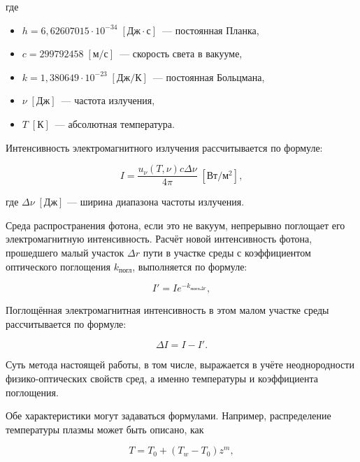 \noindent где
\begin{itemize}
	\item $h = 6,62607015 \cdot 10^{-34} \; \left[\text{Дж}\cdot\text{с}\right]$~— постоянная Планка,
	\item $c = 299792458 \; \left[\text{м}/\text{с}\right]$~— скорость света в вакууме,
	\item $k = 1,380649 \cdot 10^{-23} \; \left[\text{Дж}/\text{К}\right]$~— постоянная Больцмана,
	\item $\nu \; \left[\text{Дж}\right]$~— частота излучения,
	\item $T \; \left[\text{К}\right]$~— абсолютная температура.
\end{itemize}

Интенсивность электромагнитного излучения рассчитывается по формуле:

\begin{equation}
	\label{eqn:intensity-plank}
	I = \frac{u_\nu(T, \nu)c\Delta\nu}{4\pi} \; \left[\text{Вт}/\text{м}^2\right],
\end{equation}

\noindent где $\Delta\nu \; \left[\text{Дж}\right]$ — ширина диапазона частоты излучения.

Среда распространения фотона, если это не вакуум, непрерывно поглощает его электромагнитную интенсивность.
Расчёт новой интенсивность фотона, прошедшего малый участок $\Delta r$ пути в участке среды с коэффициентом оптического поглощения $k_{\text{погл}}$, выполняется по формуле:

\begin{equation}
	\label{eqn:intensity-begin}
	I' = Ie^{-k_{\text{погл}\Delta r}},
\end{equation}

Поглощённая электромагнитная интенсивность в этом малом участке среды рассчитывается по формуле:

\begin{equation}
	\label{eqn:intensity-end}
	\Delta I = I - I'.
\end{equation}

Суть метода настоящей работы, в том числе, выражается в учёте неоднородности физико-оптических свойств сред, а именно температуры и коэффициента поглощения.

Обе характеристики могут задаваться формулами.
Например, распределение температуры плазмы может быть описано, как

\begin{equation}
	\label{eqn:xenon-temperature}
	T = T_0 + (T_w - T_0)z^m,
\end{equation}

